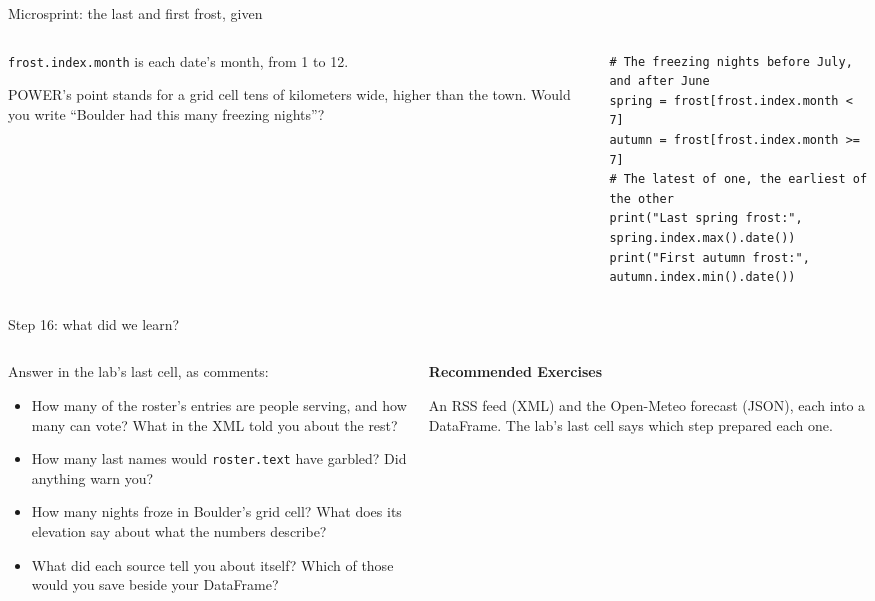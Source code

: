 \documentclass[9pt,aspectratio=169]{beamer}
\begin{document}
\begin{frame}[fragile]{Microsprint: the last and first frost, given}
    \begin{columns}[T]
        \begin{column}{0.37\textwidth}
            \texttt{frost.index.month} is each date's month, from 1 to 12.

            \medskip
            POWER's point stands for a grid cell tens of kilometers wide, higher than the town. Would you write ``Boulder had this many freezing nights''?
        \end{column}
        \begin{column}{0.6\textwidth}
\begin{lstlisting}
# The freezing nights before July, and after June
spring = frost[frost.index.month < 7]
autumn = frost[frost.index.month >= 7]
# The latest of one, the earliest of the other
print("Last spring frost:", spring.index.max().date())
print("First autumn frost:", autumn.index.min().date())
\end{lstlisting}
        \end{column}
    \end{columns}
\end{frame}


\begin{frame}{Step 16: what did we learn?}
    \begin{columns}[T]
        \begin{column}{0.6\textwidth}
            Answer in the lab's last cell, as comments:
            \begin{itemize}\small
                \item How many of the roster's entries are people serving, and how many can vote? What in the XML told you about the rest?
                \item How many last names would \texttt{roster.text} have garbled? Did anything warn you?
                \item How many nights froze in Boulder's grid cell? What does its elevation say about what the numbers describe?
                \item What did each source tell you about itself? Which of those would you save beside your DataFrame?
            \end{itemize}
        \end{column}
        \begin{column}{0.35\textwidth}
            \textbf{Recommended Exercises}\\[2pt]
            {\footnotesize An RSS feed (XML) and the Open-Meteo forecast (JSON), each into a DataFrame. The lab's last cell says which step prepared each one.\par}
        \end{column}
    \end{columns}
\end{frame}
\end{document}
